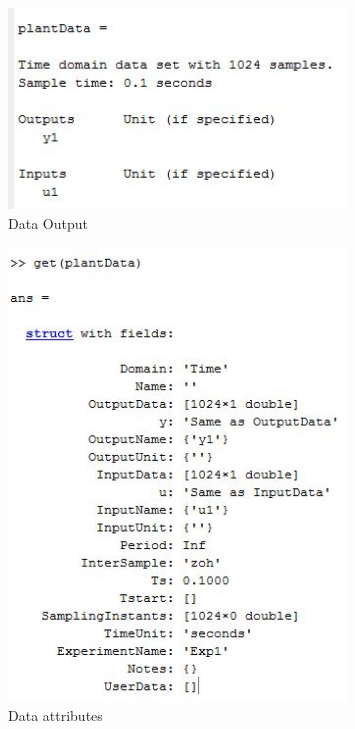 \documentclass[a4paper,12pt]{report}
\begin{document}
			
			\begin{figure}[tbp]
				\centering
				\includegraphics[width=0.8\textwidth]{datMat1.JPG}
				\caption{Data Output}
				\label{}
			\end{figure}
		
		\begin{figure}[tbp]
			\centering
			\includegraphics[width=0.8\textwidth]{datMat.JPG}
			\caption{Data attributes}
			\label{}
		\end{figure}
			
\end{document}
